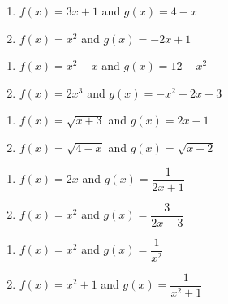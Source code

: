 \begin{multicols}{2}
\begin{enumerate}

\item  $f(x) = 3x+1$ and  $g(x) = 4-x$ \label{basicarithonefirst}
\item  $f(x) = x^2$ and $g(x) = -2x+1$

\setcounter{HW}{\value{enumi}}
\end{enumerate}
\end{multicols}

\begin{multicols}{2}
\begin{enumerate}
\setcounter{enumi}{\value{HW}}

\item  $f(x) = x^2 - x$ and  $g(x) = 12-x^2$
\item  $f(x) = 2x^3$ and $g(x) = -x^2-2x-3$

\setcounter{HW}{\value{enumi}}
\end{enumerate}
\end{multicols}

\begin{multicols}{2}
\begin{enumerate}
\setcounter{enumi}{\value{HW}}

\item  $f(x) = \sqrt{x+3}$ and  $g(x) = 2x-1$
\item  $f(x) = \sqrt{4-x}$ and $g(x) = \sqrt{x+2}$

\setcounter{HW}{\value{enumi}}
\end{enumerate}
\end{multicols}

\begin{multicols}{2}
\begin{enumerate}
\setcounter{enumi}{\value{HW}}

\item  $f(x) = 2x$ and  $g(x) = \dfrac{1}{2x+1}$
\item  $f(x) = x^2$ and $g(x) = \dfrac{3}{2x-3}$

\setcounter{HW}{\value{enumi}}
\end{enumerate}
\end{multicols}

\begin{multicols}{2}
\begin{enumerate}
\setcounter{enumi}{\value{HW}}

\item  $f(x) = x^2$ and  $g(x) = \dfrac{1}{x^2}$
\item  $f(x) = x^2+1$ and $g(x) = \dfrac{1}{x^2+1}$ \label{basicarithonelast}

\setcounter{HW}{\value{enumi}}
\end{enumerate}
\end{multicols}

